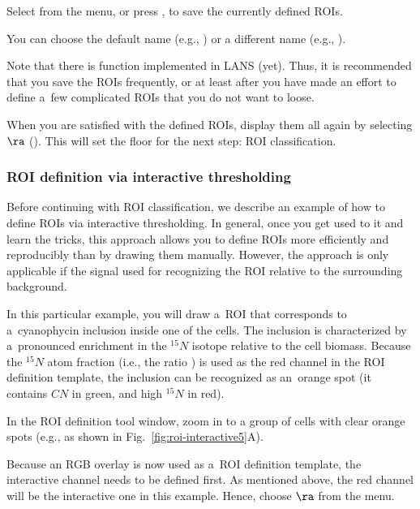 \s Select  from the menu, or press , to save the currently defined ROIs. 

\bul You can choose the default name (e.g., ) or a different name (e.g., ).

\nb
\bul Note that there is  function implemented in LANS (yet). Thus, it is recommended that you save the ROIs frequently, or at least after you have made an effort to define a~few complicated ROIs that you do not want to loose.

\s When you are satisfied with the defined ROIs, display them all again by selecting  $\ra$  (). This will set the floor for the next step: ROI classification.


\subsubsection{ROI definition via interactive thresholding}
\setcounter{step}{0}

\goldbox{}
Before continuing with ROI classification, we describe an example of how to define ROIs via interactive thresholding. In general, once you get used to it and learn the tricks, this approach allows you to define ROIs more efficiently and reproducibly than by drawing them manually. However, the approach is only applicable if the signal used for recognizing the ROI  relative to the surrounding background.
\tcbe

In this particular example, you will draw a~ROI that corresponds to a~cyanophycin inclusion inside one of the cells. The inclusion is characterized by a~pronounced enrichment in the ${}^{15}N$ isotope relative to the cell biomass. Because the ${}^{15}N$ atom fraction (i.e., the ratio ) is used as the red channel in the ROI definition template, the inclusion can be recognized as an~orange spot (it contains $CN$ in green, and high ${}^{15}N$ in red).

\s In the ROI definition tool window, zoom in to a group of cells with clear orange spots (e.g., as shown in Fig.~\ref{fig:roi-interactive5}A).

\s Because an RGB overlay is now used as a~ROI definition template, the interactive channel needs to be defined first. As mentioned above, the red channel will be the interactive one in this example. Hence, choose  $\ra$  from the menu. 

